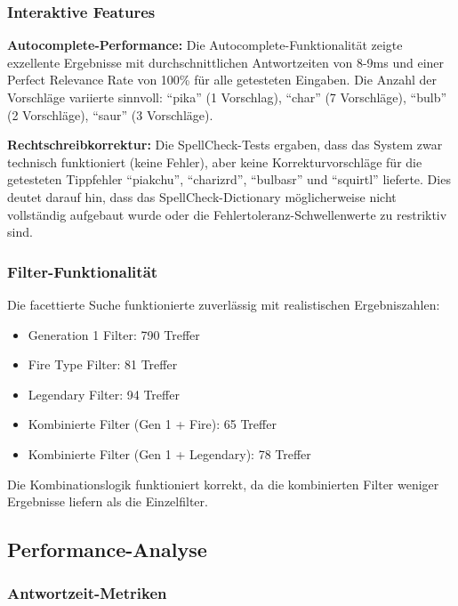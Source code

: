 \subsubsection{Interaktive Features}

\textbf{Autocomplete-Performance:} Die Autocomplete-Funktionalität zeigte exzellente Ergebnisse mit durchschnittlichen Antwortzeiten von 8-9ms und einer Perfect Relevance Rate von 100\% für alle getesteten Eingaben. Die Anzahl der Vorschläge variierte sinnvoll: "`pika"' (1 Vorschlag), "`char"' (7 Vorschläge), "`bulb"' (2 Vorschläge), "`saur"' (3 Vorschläge).

\textbf{Rechtschreibkorrektur:} Die SpellCheck-Tests ergaben, dass das System zwar technisch funktioniert (keine Fehler), aber keine Korrekturvorschläge für die getesteten Tippfehler "`piakchu"', "`charizrd"', "`bulbasr"' und "`squirtl"' lieferte. Dies deutet darauf hin, dass das SpellCheck-Dictionary möglicherweise nicht vollständig aufgebaut wurde oder die Fehlertoleranz-Schwellenwerte zu restriktiv sind.

\subsubsection{Filter-Funktionalität}

Die facettierte Suche funktionierte zuverlässig mit realistischen Ergebniszahlen:
\begin{itemize}
    \item Generation 1 Filter: 790 Treffer
    \item Fire Type Filter: 81 Treffer  
    \item Legendary Filter: 94 Treffer
    \item Kombinierte Filter (Gen 1 + Fire): 65 Treffer
    \item Kombinierte Filter (Gen 1 + Legendary): 78 Treffer
\end{itemize}

Die Kombinationslogik funktioniert korrekt, da die kombinierten Filter weniger Ergebnisse liefern als die Einzelfilter.

\subsection{Performance-Analyse}

\subsubsection{Antwortzeit-Metriken}


